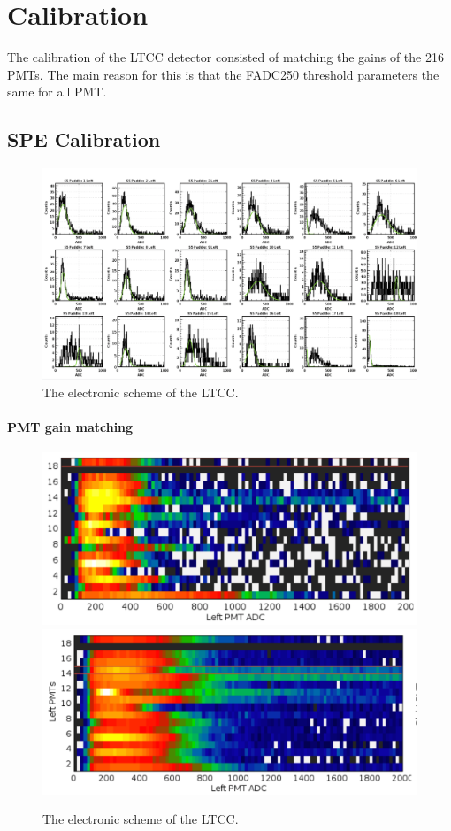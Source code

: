\section{Calibration}

The calibration of the LTCC detector consisted of matching the gains of the 216 PMTs.
The main reason for this is that the FADC250 threshold parameters the same for all PMT.


\subsection{SPE Calibration}

\begin{figure}
	\centering
	\includegraphics[width=0.95\columnwidth,keepaspectratio]{img/spe.png}
	\caption{The electronic scheme of the LTCC.}
	\label{fig:speCalibration}
\end{figure}


\paragraph{PMT gain matching}


\begin{figure}
	\centering
	\includegraphics[width=0.95\columnwidth,keepaspectratio]{img/gainMatchingBefore.png}
	\includegraphics[width=0.95\columnwidth,keepaspectratio]{img/gainMatchingAfter.png}
	\caption{The electronic scheme of the LTCC.}
	\label{fig:gainMatching}
\end{figure}




